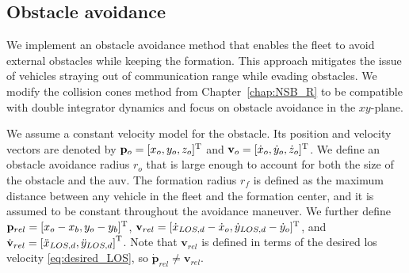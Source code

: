 \subsection{Obstacle avoidance}\label{sec:obstacle_avoidance}
We implement an obstacle avoidance method that enables the fleet to avoid external obstacles while keeping the formation. This approach mitigates the issue of vehicles straying out of communication range while evading obstacles. We modify the collision cones method from Chapter~\ref{chap:NSB_R} to be compatible with double integrator dynamics and focus on obstacle avoidance in the $xy$-plane.

We assume a constant velocity model for the obstacle. Its position and velocity vectors are denoted by $\mathbf{p}_o = [x_o, y_o, z_o]^{\mathrm{T}}$ and $\mathbf{v}_o = [\dot{x}_o, \dot{y}_o, \dot{z}_o]^{\mathrm{T}}$. We define an obstacle avoidance radius $r_o$ that is large enough to account for both the size of the obstacle and the \gls{auv}. The formation radius $r_f$ is defined as the maximum distance between any vehicle in the fleet and the formation center, and it is assumed to be constant throughout the avoidance maneuver. We further define $\mathbf{p}_{rel} = [x_o-x_b, y_o-y_b]^{\mathrm{T}}$, $\mathbf{v}_{rel} = [\dot{x}_{LOS,d}-\dot{x}_o, \dot{y}_{LOS,d} - \dot{y}_o ]^{\mathrm{T}}$, and $\dot{\mathbf{v}}_{rel} = \left[ \ddot{x}_{LOS,d},  \ddot{y}_{LOS,d}\right]^{\mathrm{T}}$. Note that $\mathbf{v}_{rel}$ is defined in terms of the desired \gls{los} velocity \eqref{eq:desired_LOS}, so $\dot{\mathbf{p}}_{rel} \neq \mathbf{v}_{rel}$.

